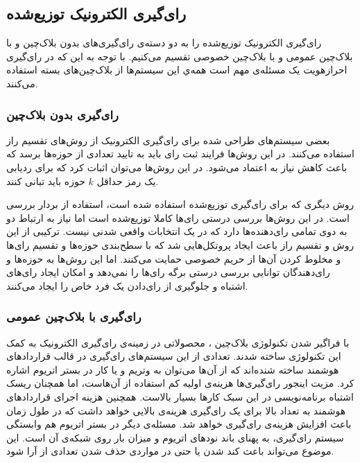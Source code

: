 \subsection{رای‌گیری الکترونیک توزیع‌شده}
رای‌گیری الکترونیک توزیع‌شده را به دو دسته‌ی رای‌گیری‌های بدون بلاک‌چین و با بلاک‌چین عمومی و با بلاک‌چین خصوصی تقسیم می‌کنیم. با توجه به این که در رای‌گیری احرازهویت یک مسئله‌ی مهم است همه‌ي این سیستم‌ها از بلاک‌چین‌های بسته استفاده می‌کنند.
\subsubsection{رای‌گیری بدون بلاک‌چین} 
بعضی سیستم‌های طراحی شده برای رای‌گیری الکترونیک
\cite{secret1}
\cite{secret2}
\cite{secret3}
 از روش‌های تقسیم راز
 استفاده می‌کنند. در این روش‌ها فرایند ثبت رای باید به تایید تعدادی از حوزه‌ها برسد که باعث کاهش نیاز به اعتماد می‌شود. در این روش‌ها می‌توان اثبات کرد که برای ردیابی یک رمز حداقل $k$ حوزه باید تبانی کنند. 
 \par
 روش دیگری که برای رای‌گیری توزیع‌شده استفاده شده است، استفاده از بردار‌ بررسی
 \cite{checkvector}
 است. در این روش‌ها بررسی درستی رای‌ها کاملا توزیع‌شده‌ است اما نیاز به ارتباط دو به دوی تمامی رای‌دهنده‌ها دارد که در یک انتخابات واقعی شدنی نیست. ترکیبی از این روش و تقسیم راز باعث ایجاد پروتکل‌هایی
 \cite{MPO1} \cite{evotinwocrypto}
  شد که با سطح‌بندی حوزه‌ها و تقسیم رای‌ها و مخلوط کردن آن‌ها از حریم خصوصی حمایت می‌کنند. اما این روش‌ها به حوزه‌ها و رای‌دهندگان توانایی بررسی درستی برگه رای‌ها را نمی‌دهد و امکان ایجاد رای‌های اشتباه و جلوگیری از رای‌دادن یک فرد خاص را ایجاد می‌کنند. 


\subsubsection{رای‌گیری با بلاک‌چین عمومی}
با فراگیر شدن تکنولوژی بلاک‌چین
\cite{rosgood}
، محصولاتی در زمینه‌ی رای‌گیری الکترونیک به کمک این تکنولوژی ساخته شدند. تعدادی از این سیستم‌های رای‌گیری در قالب قرارداد‌های هوشمند ساخته‌ شنده‌اند که از آن‌ها می‌توان به وتریم 
\cite{votereum}
و یا کار 
\cite{yavuz}
در بستر اتریوم اشاره کرد. مزیت اینجور رای‌گیری‌ها هزینه‌ی اولیه کم استفاده از آن‌هاست، اما همچنان ریسک اشتباه برنامه‌نویسی در این سبک کارها بسیار بالاست. همچنین هزینه اجرای قراردادهای هوشمند به تعداد بالا برای یک رای‌گیری هزینه‌ی بالایی خواهد داشت که در طول زمان باعث افزایش هزینه‌ی رای‌گیری خواهد شد. مسئله‌ی دیگر در بستر اتریوم هم وابستگی سیستم رای‌گیری، به پهنای باند نود‌های اتریوم و میزان بار روی شبکه‌ی آن است. این موضوع می‌تواند باعث کند شدن یا حتی در مواردی حذف شدن تعدادی از آرا شود.


